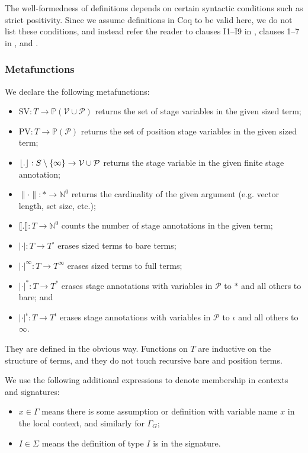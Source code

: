 \documentclass[nonacm,screen,10pt]{acmart}
\begin{document}
The well-formedness of \coinductive definitions depends on certain syntactic conditions such as strict positivity. Since we assume definitions in Coq to be valid here, we do not list these conditions, and instead refer the reader to clauses I1--I9 in \cite{cic-hat-bar}, clauses 1--7 in \cite{cic-hat}, and \cite{coq}.

\subsubsection{Metafunctions}

We declare the following metafunctions:

\begin{itemize}
    \item $\text{SV}: T \to \mathbb{P}(\mathcal{V} \cup \mathcal{P})$ returns the set of stage variables in the given sized term;
    \item $\text{PV}: T \to \mathbb{P}(\mathcal{P})$ returns the set of position stage variables in the given sized term;
    \item $\lfloor . \rfloor: S \setminus \{\infty\} \to \mathcal{V} \cup \mathcal{P}$ returns the stage variable in the given finite stage annotation;
    \item $\|\cdot\|: * \to \mathbb{N}^0$ returns the cardinality of the given argument (e.g. vector length, set size, etc.);
    \item $\llbracket.\rrbracket: T \to \mathbb{N}^0$ counts the number of stage annotations in the given term;
    \item $|\cdot|: T \to T^\circ$ erases sized terms to bare terms;
    \item $|\cdot|^\infty: T \to T^\infty$ erases sized terms to full terms;
    \item $|\cdot|^*: T \to T^*$ erases stage annotations with variables in $\mathcal{P}$ to $*$ and all others to bare; and
    \item $|\cdot|^\iota: T \to T^\iota$ erases stage annotations with variables in $\mathcal{P}$ to $\iota$ and all others to $\infty$.
\end{itemize}

They are defined in the obvious way. Functions on $T$ are inductive on the structure of terms, and they do not touch recursive bare and position terms.

We use the following additional expressions to denote membership in contexts and signatures:

\begin{itemize}
    \item $x \in \Gamma$ means there is some assumption or definition with variable name $x$ in the local context, and similarly for $\Gamma_G$;
    \item $I \in \Sigma$ means the \coinductive definition of type $I$ is in the signature.
\end{itemize}
\end{document}
